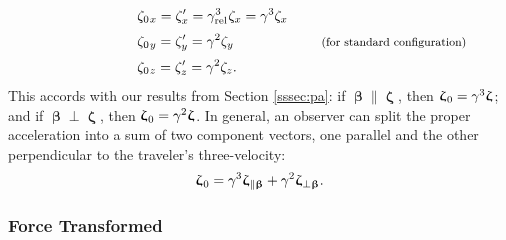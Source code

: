 \documentclass[12pt]{article}
\newcommand{\vvbeta}{\bm{\upbeta}}
\newcommand{\vvzeta}{\bm{\upzeta}}
\begin{document}
\begin{equation*}
\begin{aligned}
\qquad \qquad \qquad & \zeta_{0 \mkern1.5mu x} = \zeta_x^\prime  = \gamma_{\textrm{rel}}^3 \mkern1mu \zeta_x = \gamma^3 \zeta_x \\[2pt]
& \zeta_{0 \mkern1.5mu y} = \zeta_y^\prime  = \gamma^2  \zeta_y  \qquad \qquad \qquad \textrm{\footnotesize{ (for standard configuration)}} \\[2pt]
& \zeta_{0 \mkern1.5mu z} = \zeta_z^\prime  = \gamma^2 \zeta_z .
\end{aligned}
\end{equation*}
This accords with our results from Section \ref{sssec:pa}: if $\vvbeta \parallel \vvzeta$, then $\vvzeta_{\mkern1mu 0} = \gamma^3 \vvzeta$; and if $\vvbeta \perp \vvzeta$, then $\vvzeta_{\mkern1mu 0} = \gamma^2 \vvzeta$. In general, an observer can split the proper acceleration into a sum of two component vectors, one parallel and the other perpendicular to the traveler's three-velocity:
\begin{equation}\label{eq:pa}
\vvzeta_{\mkern1mu 0} = \gamma^3 \vvzeta_{\parallel \vvbeta} + \gamma^2 \vvzeta_{\perp \vvbeta}.
\end{equation}

\subsubsection{Force Transformed}\label{sssec:ft}
\end{document}
